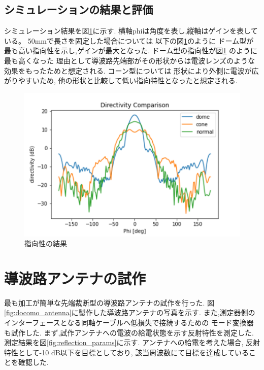 \documentclass[technicalreport]{ieicej}
\begin{document}
\subsection{シミュレーションの結果と評価}

シミュレーション結果を図\ref{fig:directivity_results}に示す.
横軸phiは角度を表し,縦軸はゲインを表している。
50mmで長さを固定した場合については
以下の図\ref{fig:directivity_results}のように
ドーム型が最も高い指向性を示し,ゲインが最大となった.
ドーム型の指向性が図\ref{fig:directivity_results} のように最も高くなった
理由として導波路先端部がその形状からは電波レンズのような効果をもったためと想定される.
コーン型については
形状により外側に電波が広がりやすいため,
他の形状と比較して低い指向特性となったと想定される.

\begin{figure}[tb]
  \begin{center}
    \includegraphics[bb=0.000000 0.000000 432.098422 288.065615, width=1.0\linewidth]{img/directivity_comparison.pdf}
    \caption{指向性の結果}
    \label{fig:directivity_results}
  \end{center}
\end{figure}

\section{導波路アンテナの試作}

最も加工が簡単な先端裁断型の導波路アンテナの試作を行った.
図\ref{fig:docomo_antenna}に製作した導波路アンテナの写真を示す.
また,測定器側のインターフェースとなる同軸ケーブルへ低損失で接続するための
モード変換器も試作した.
まず,試作アンテナへの電波の給電状態を示す反射特性を測定した.
測定結果を図\ref{fig:reflection_params}に示す.
アンテナへの給電を考えた場合,
反射特性として-10 dB以下を目標としており,
該当周波数にて目標を達成していることを確認した.
\end{document}
